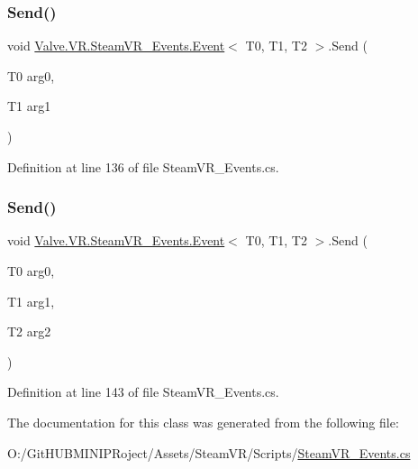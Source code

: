 \mbox{\label{class_valve_1_1_v_r_1_1_steam_v_r___events_1_1_event_a7cae509468245af221f710c4d8312ed7}} 
\subsubsection{\texorpdfstring{Send()}{Send()}\hspace{0.1cm}{\footnotesize\ttfamily [3/4]}}
{\footnotesize\ttfamily void \mbox{\hyperlink{class_valve_1_1_v_r_1_1_steam_v_r___events_1_1_event}{Valve.\+V\+R.\+Steam\+V\+R\+\_\+\+Events.\+Event}}$<$ T0, T1, T2 $>$.Send (\begin{DoxyParamCaption}\item[{T0}]{arg0,  }\item[{T1}]{arg1 }\end{DoxyParamCaption})}



Definition at line 136 of file Steam\+V\+R\+\_\+\+Events.\+cs.

\mbox{\label{class_valve_1_1_v_r_1_1_steam_v_r___events_1_1_event_ad8515dba66bf603a85a343211e040069}} 
\subsubsection{\texorpdfstring{Send()}{Send()}\hspace{0.1cm}{\footnotesize\ttfamily [4/4]}}
{\footnotesize\ttfamily void \mbox{\hyperlink{class_valve_1_1_v_r_1_1_steam_v_r___events_1_1_event}{Valve.\+V\+R.\+Steam\+V\+R\+\_\+\+Events.\+Event}}$<$ T0, T1, T2 $>$.Send (\begin{DoxyParamCaption}\item[{T0}]{arg0,  }\item[{T1}]{arg1,  }\item[{T2}]{arg2 }\end{DoxyParamCaption})}



Definition at line 143 of file Steam\+V\+R\+\_\+\+Events.\+cs.



The documentation for this class was generated from the following file\+:\begin{DoxyCompactItemize}
\item 
O\+:/\+Git\+H\+U\+B\+M\+I\+N\+I\+P\+Roject/\+Assets/\+Steam\+V\+R/\+Scripts/\mbox{\hyperlink{_steam_v_r___events_8cs}{Steam\+V\+R\+\_\+\+Events.\+cs}}\end{DoxyCompactItemize}
